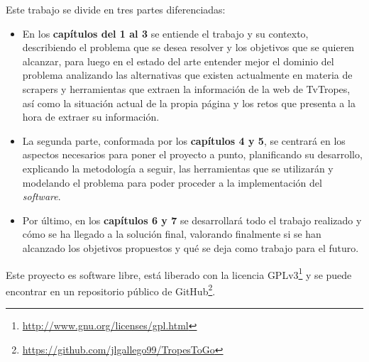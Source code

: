 Este trabajo se divide en tres partes diferenciadas:
\begin{itemize}
    \item En los \textbf{capítulos del 1 al 3} se entiende el trabajo y su
    contexto, describiendo el problema que se desea resolver y los objetivos que
    se quieren alcanzar, para luego en el estado del arte entender mejor el
    dominio del problema analizando las alternativas que existen actualmente en
    materia de scrapers y herramientas que extraen la información de la web de
    TvTropes, así como la situación actual de la propia página y los retos que
    presenta a la hora de extraer su información.
    \item La segunda parte, conformada por los \textbf{capítulos 4 y 5}, se
    centrará en los aspectos necesarios para poner el proyecto a punto,
    planificando su desarrollo, explicando la metodología a seguir, las
    herramientas que se utilizarán y modelando el problema para poder proceder a
    la implementación del \textit{software}.
    \item Por último, en los \textbf{capítulos 6 y 7} se desarrollará todo el
    trabajo realizado y cómo se ha llegado a la solución final, valorando
    finalmente si se han alcanzado los objetivos propuestos y qué se deja como
    trabajo para el futuro.
\end{itemize}

Este proyecto es software libre, está liberado con la licencia
GPLv3\footnote{\url{http://www.gnu.org/licenses/gpl.html}} y se puede encontrar
en un repositorio público de
GitHub\footnote{\url{https://github.com/jlgallego99/TropesToGo}}.

